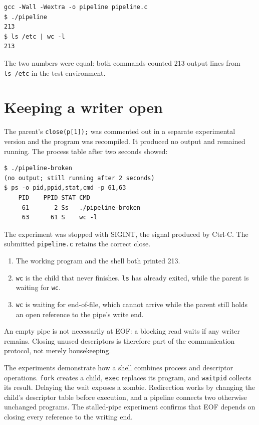 \documentclass{../latex/utmreport}
\providecommand{\tightlist}{\setlength{\itemsep}{0pt}\setlength{\parskip}{0pt}}
\begin{document}
\begin{lstlisting}
gcc -Wall -Wextra -o pipeline pipeline.c
$ ./pipeline
213
$ ls /etc | wc -l
213
\end{lstlisting}

The two numbers were equal: both commands counted 213 output lines from
\texttt{ls\ /etc} in the test environment.

\section{Keeping a writer open}\label{keeping-a-writer-open}

The parent's \texttt{close(p{[}1{]});} was commented out in a separate
experimental version and the program was recompiled. It produced no
output and remained running. The process table after two seconds showed:

\begin{lstlisting}
$ ./pipeline-broken
(no output; still running after 2 seconds)
$ ps -o pid,ppid,stat,cmd -p 61,63
    PID    PPID STAT CMD
     61       2 Ss   ./pipeline-broken
     63      61 S    wc -l
\end{lstlisting}

The experiment was stopped with SIGINT, the signal produced by Ctrl-C.
The submitted \texttt{pipeline.c} retains the correct close.

\begin{enumerate}
\def\labelenumi{\arabic{enumi}.}
\tightlist
\item
  The working program and the shell both printed 213.
\item
  \texttt{wc} is the child that never finishes. \texttt{ls} has already
  exited, while the parent is waiting for \texttt{wc}.
\item
  \texttt{wc} is waiting for end-of-file, which cannot arrive while the
  parent still holds an open reference to the pipe's write end.
\end{enumerate}

An empty pipe is not necessarily at EOF: a blocking read waits if any
writer remains. Closing unused descriptors is therefore part of the
communication protocol, not merely housekeeping.

\utmconclusions

The experiments demonstrate how a shell combines process and descriptor
operations. \texttt{fork} creates a child, \texttt{exec} replaces its
program, and \texttt{waitpid} collects its result. Delaying the wait
exposes a zombie. Redirection works by changing the child's descriptor
table before execution, and a pipeline connects two otherwise unchanged
programs. The stalled-pipe experiment confirms that EOF depends on
closing every reference to the writing end.
\end{document}
